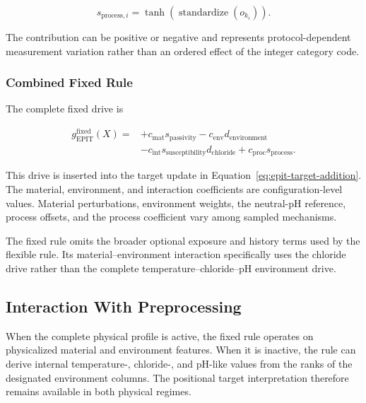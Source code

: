 \documentclass{article}
\begin{document}
\begin{equation}
s_{\mathrm{process},i}
=
\tanh
\left(
\operatorname{standardize}(o_{k_i})
\right).
\label{eq:fixed-process-signal}
\end{equation}

The contribution can be positive or negative and represents protocol-dependent measurement variation rather than an ordered effect of the integer category code.

\subsubsection{Combined Fixed Rule}

The complete fixed drive is

\begin{equation}
\begin{aligned}
g_{\mathrm{EPIT}}^{\mathrm{fixed}}(X)
={}&
+c_{\mathrm{mat}}s_{\mathrm{passivity}}
-c_{\mathrm{env}}d_{\mathrm{environment}}\\
&-c_{\mathrm{int}}
s_{\mathrm{susceptibility}}
d_{\mathrm{chloride}}
+c_{\mathrm{proc}}s_{\mathrm{process}}.
\end{aligned}
\label{eq:fixed-epit-drive}
\end{equation}

This drive is inserted into the target update in Equation~\eqref{eq:epit-target-addition}. The material, environment, and interaction coefficients are configuration-level values. Material perturbations, environment weights, the neutral-pH reference, process offsets, and the process coefficient vary among sampled mechanisms.

The fixed rule omits the broader optional exposure and history terms used by the flexible rule. Its material--environment interaction specifically uses the chloride drive rather than the complete temperature--chloride--pH environment drive.

\subsection{Interaction With Preprocessing}

When the complete physical profile is active, the fixed rule operates on physicalized material and environment features. When it is inactive, the rule can derive internal temperature-, chloride-, and pH-like values from the ranks of the designated environment columns. The positional target interpretation therefore remains available in both physical regimes.
\end{document}
